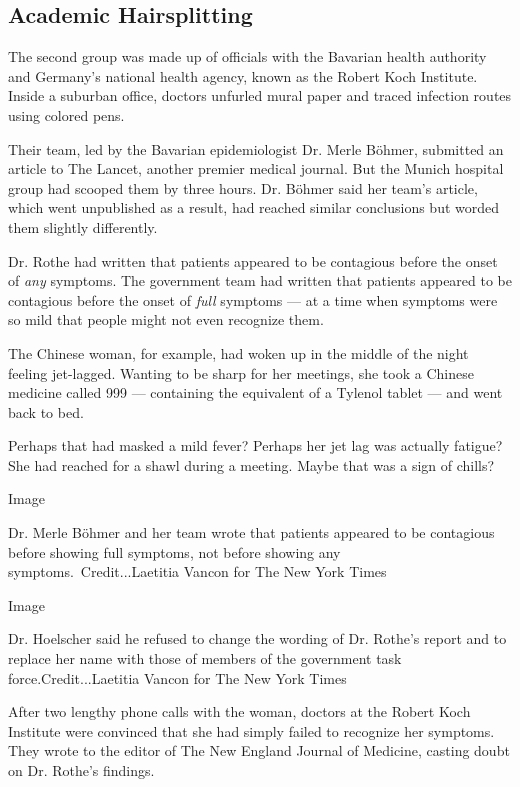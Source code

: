 \hypertarget{academic-hairsplitting}{%
\subsection{Academic Hairsplitting}\label{academic-hairsplitting}}

The second group was made up of officials with the Bavarian health
authority and Germany's national health agency, known as the Robert Koch
Institute. Inside a suburban office, doctors unfurled mural paper and
traced infection routes using colored pens.

Their team, led by the Bavarian epidemiologist Dr. Merle Böhmer,
submitted an article to The Lancet, another premier medical journal. But
the Munich hospital group had scooped them by three hours. Dr. Böhmer
said her team's article, which went unpublished as a result, had reached
similar conclusions but worded them slightly differently.

Dr. Rothe had written that patients appeared to be contagious before the
onset of \emph{any} symptoms. The government team had written that
patients appeared to be contagious before the onset of \emph{full}
symptoms --- at a time when symptoms were so mild that people might not
even recognize them.

The Chinese woman, for example, had woken up in the middle of the night
feeling jet-lagged. Wanting to be sharp for her meetings, she took a
Chinese medicine called 999 --- containing the equivalent of a Tylenol
tablet --- and went back to bed.

Perhaps that had masked a mild fever? Perhaps her jet lag was actually
fatigue? She had reached for a shawl during a meeting. Maybe that was a
sign of chills?

Image

Dr. Merle Böhmer and her team wrote that patients appeared to be
contagious before showing full symptoms, not before showing any
symptoms.~Credit...Laetitia Vancon for The New York Times

Image

Dr. Hoelscher said he refused to change the wording of Dr. Rothe's
report and to replace her name with those of members of the government
task force.Credit...Laetitia Vancon for The New York Times

After two lengthy phone calls with the woman, doctors at the Robert Koch
Institute were convinced that she had simply failed to recognize her
symptoms. They wrote to the editor of The New England Journal of
Medicine, casting doubt on Dr. Rothe's findings.

